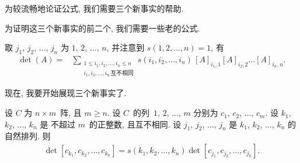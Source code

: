\documentclass[%
    UTF8,%
    fontset=none,%
    punct=kaiming,%
    zihao=-4,%
    a4paper,%
    oneside,%
]{ctexbook}
\renewcommand*{\leq}{\leqslant}
\renewcommand*{\geq}{\geqslant}
\begin{document}
为较流畅地论证公式,
我们需要三个新事实的帮助.

为证明这三个新事实的前二个,
我们需要一些老的公式.

\TheoremFullExpansion*

取 \(j_1\), \(j_2\), \(\dots\), \(j_n\)
为 \(1\), \(2\), \(\dots\), \(n\),
并注意到 \(s(1, 2, \dots, n) = 1\),
有
\begin{align*}
    \det {(A)}
    = {} &
    \sum_{\substack{
    1 \leq i_1, i_2, \dots, i_n \leq n \\
            i_1, i_2, \dots, i_n\,\text{互不相同}
        }}
    {s(i_1, i_2, \dots, i_n)\,
        [A]_{i_1,1} [A]_{i_2,2} \dots [A]_{i_n,n}}.
\end{align*}

\TheoremColumnSwapAndSign*

现在, 我要开始展现三个新事实了.

\begin{theorem}
    设 \(C\) 为 \(n \times m\)~阵,
    且 \(m \geq n\).
    设 \(C\)~的列~\(1\), \(2\), \(\dots\), \(m\)
    分别为 \(c_1\), \(c_2\), \(\dots\), \(c_m\).
    设 \(k_1\), \(k_2\), \(\dots\), \(k_n\) 是%
    不超过 \(m\)~的正整数,
    且互不相同.
    设 \(j_1\), \(j_2\), \(\dots\), \(j_n\) 是
    \(k_1\), \(k_2\), \(\dots\), \(k_n\) 的自然排列.
    则
    \begin{align*}
        \det {[c_{k_1}, c_{k_2}, \dots, c_{k_n}]}
        = s(k_1, k_2, \dots, k_n)
        \det {[c_{j_1}, c_{j_2}, \dots, c_{j_n}]}.
    \end{align*}
\end{theorem}
\end{document}
